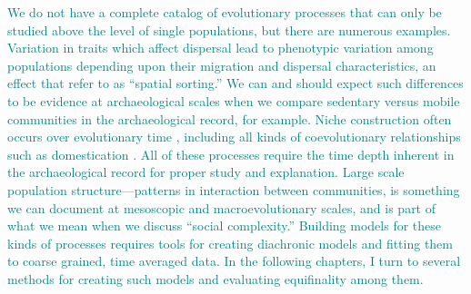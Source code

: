 \textcolor{teal}{We do not have a complete catalog of evolutionary processes that can only be studied above the level of single populations, but there are numerous examples. Variation in traits which affect dispersal lead to phenotypic variation among populations depending upon their migration and dispersal characteristics, an effect that \citet{shine2011evolutionary} refer to as ``spatial sorting.''  We can and should expect such differences to be evidence at archaeological scales when we compare sedentary versus mobile communities in the archaeological record, for example.  Niche construction often occurs over evolutionary time \citep{Laland2000,Odling-Smee2003,Odling-Smee2007}, including all kinds of coevolutionary relationships such as domestication \citep{rindos1984origins}.  All of these processes require the time depth inherent in the archaeological record for proper study and explanation.  Large scale population structure---patterns in interaction between communities, is something we can document at mesoscopic and macroevolutionary scales, and is part of what we mean when we discuss ``social complexity.''  Building models for these kinds of processes requires tools for creating diachronic models and fitting them to coarse grained, time averaged data.  In the following chapters, I turn to several methods for creating such models and evaluating equifinality among them.  
}

